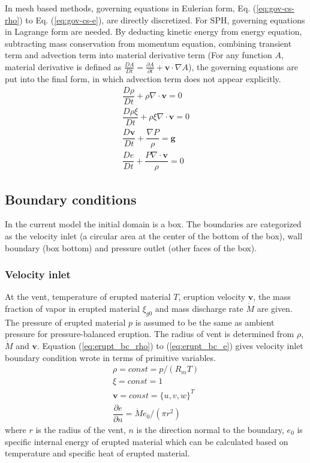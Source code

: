 \documentclass[gmd, manuscript]{copernicus}
\begin{document}
In mesh based methods, governing equations in Eulerian form, Eq. (\ref{eq:gov-cs-rho}) to Eq. (\ref{eq:gov-cs-e}), are directly discretized. For SPH, governing equations in Lagrange form are needed. By deducting kinetic energy from energy equation, subtracting mass conservation from momentum equation, combining transient term and advection term into material derivative term (For any function $A$, material derivative is defined as $\frac{D A}{Dt} = \frac{\partial A}{\partial t} + \textbf{v} \cdot \nabla A$), the governing equations are put into the final form, in which advection term does not appear explicitly.
\begin{align}
\dfrac{D \rho}{D t} + \rho \nabla \cdot \textbf{v} = 0 \label{eq:gov-nc-rho}\\
\dfrac{D \rho \xi}{D t} + \rho \xi \nabla \cdot \textbf{v} = 0 \label{eq:gov-nc-ks}\\
\dfrac{D \textbf{v}}{D t} + \dfrac{\nabla P}{\rho} =\textbf{g} \label{eq:gov-nc-v}\\
\dfrac{D e}{D t} + \dfrac{P \nabla \cdot \textbf{v}}{\rho} = 0 \label{eq:gov-nc-e}
\end{align}

\subsection{Boundary conditions}
In the current model the initial domain is a box. The boundaries are categorized as the velocity inlet (a circular area at the center of the bottom of the box), wall boundary (box bottom) and pressure outlet (other faces of the box).

\subsubsection{Velocity inlet}
At the vent, temperature of erupted material $T$, eruption velocity $\textbf{v}$, the mass fraction of vapor in erupted material $\xi_{g0}$ and mass discharge rate $\dot M$ are given. The pressure of erupted material $p$ is assumed to be the same as ambient pressure for pressure-balanced eruption. The radius of vent is determined from $\rho$, $\dot M$ and $\textbf{v}$. Equation (\ref{eq:erupt_bc_rho}) to (\ref{eq:erupt_bc_e}) gives velocity inlet boundary condition wrote in terms of primitive variables.
\begin{align}
\rho =const = p/\left(R_m T\right) \label{eq:erupt_bc_rho} \\
\xi=const=1 \label{eq:erupt_bc_xi}\\
\textbf{v} = const =\{u,v,w\}^T \label{eq:erupt_bc_v}\\
\dfrac{\partial e}{\partial n}=\dot M e_0 /\left(\pi r^2\right) \label{eq:erupt_bc_e}
\end{align} 
where $r$ is the radius of the vent, $n$ is the direction normal to the boundary, $e_0$ is specific internal energy of erupted material which can be calculated based on temperature and specific heat of erupted material.
\end{document}
